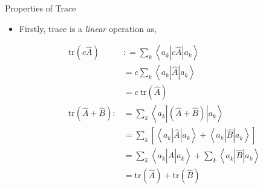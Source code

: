 \documentclass[9pt,handout]{beamer}
\newcommand{\tr}[0]{\text{tr}}
\begin{document}
\begin{frame}{Properties of Trace}
\begin{itemize}
\item Firstly, trace is a \emph{linear} operation as,

\begin{align*}
\tr \left( c \widehat{A} \right) & : = \sum_k \left\langle a_k \left\lvert c \widehat{A} \right\rvert a_k \right\rangle \\
& = c \sum_k \left\langle a_k \left\lvert \widehat{A} \right\rvert a_k \right\rangle \\
& = c \: \tr \left( \widehat{A} \right) \\
\tr \left( \widehat{A} + \widehat{B} \right) : & = \sum_k \left\langle a_k \left\lvert \left( \widehat{A} + \widehat{B} \right) \right\rvert a_k \right\rangle \\
& = \sum_k \left[ \left\langle a_k \left\lvert \widehat{A} \right\rvert a_k \right\rangle + \left\langle a_k \left\lvert \widehat{B} \right\rvert a_k \right\rangle \right] \\
& = \sum_k \left\langle a_k \left\lvert \widehat{A} \right\rvert a_k \right\rangle + \sum_k \left\langle a_k \left\lvert \widehat{B} \right\rvert a_k \right\rangle \\
& = \tr \left( \widehat{A} \right) + \tr \left( \widehat{B} \right)
\end{align*}
\end{itemize}
\end{frame}
\end{document}
